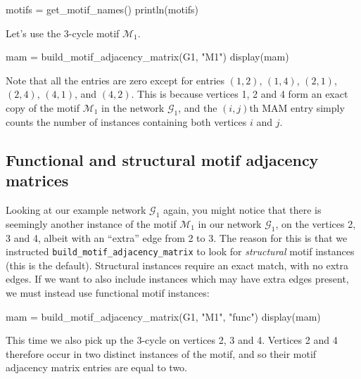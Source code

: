 \documentclass{article}
\begin{document}
\begin{tcolorbox}[colback=black!5!white,colframe=black!15!white]
\begin{juliablock}
motifs = get_motif_names()
println(motifs)
\end{juliablock}
\texttt{\obeylines\printpythontex}
\end{tcolorbox}

Let's use the 3-cycle motif $\mathcal{M}_1$.

\begin{tcolorbox}[colback=black!5!white,colframe=black!15!white]
\begin{juliablock}
mam = build_motif_adjacency_matrix(G1, "M1")
display(mam)
\end{juliablock}
\texttt{\obeylines\printpythontex}
\end{tcolorbox}

Note that all the entries are zero except for entries
$(1,2)$,
$(1,4)$,
$(2,1)$,
$(2,4)$,
$(4,1)$,
and
$(4,2)$.
This is because vertices 1, 2 and 4 form an exact copy of
the motif $\mathcal{M}_1$ in the network $\mathcal{G}_1$,
and the  $(i,j)$th MAM entry simply counts the number of instances
containing both vertices $i$ and $j$.

\subsection{Functional and structural motif adjacency matrices}

Looking at our example network $\mathcal{G}_1$ again,
you might notice that there is seemingly another instance
of the motif $\mathcal{M}_1$
in our network $\mathcal{G}_1$,
on the vertices 2, 3 and 4,
albeit with an ``extra'' edge from 2 to 3.
The reason for this is that we instructed
\texttt{build\_motif\_adjacency\_matrix}
to look for \emph{structural} motif instances (this is the default).
Structural instances require an exact match, with no extra edges.
If we want to also include instances which may have extra edges present,
we must instead use functional motif instances:

\begin{tcolorbox}[colback=black!5!white,colframe=black!15!white]
\begin{juliablock}
mam = build_motif_adjacency_matrix(G1, "M1", "func")
display(mam)
\end{juliablock}
\texttt{\obeylines\printpythontex}
\end{tcolorbox}

This time we also pick up the 3-cycle on vertices 2, 3 and 4.
Vertices 2 and 4 therefore occur in two distinct instances
of the motif, and so their motif adjacency matrix entries are equal
to two.
\end{document}
